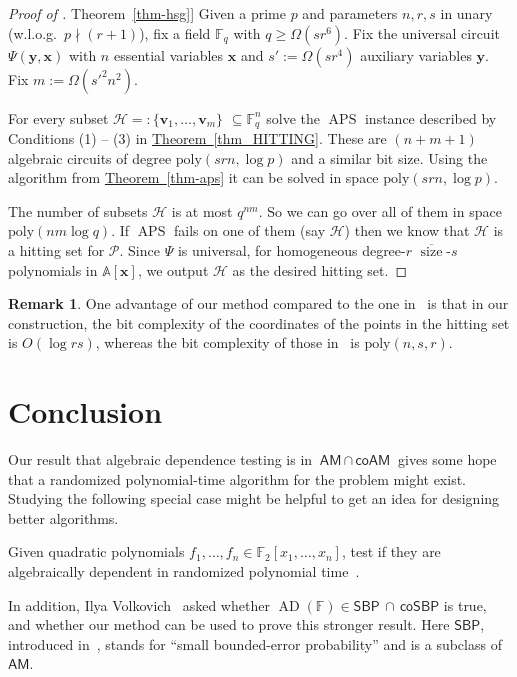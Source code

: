 \documentclass[11pt]{article}
\numberwithin{equation}{section}
\theoremstyle{definition}
\newtheorem{remark}[theorem]{Remark}
\theoremstyle{plain}
\newcommand{\cclass}[1]{\textsf{#1}}
\newcommand{\expref}[2]{\hyperref[#2]{#1~\ref{#2}}}
\newcommand{\F}{\mathbb{F}}
\newcommand{\calH}{\mathcal{H}}
\newcommand{\calP}{\mathcal{P}}
\newcommand{\aff}{\mathbb{A}}
\DeclareMathOperator{\sz}{\mathrm{size}}
\newcommand{\ol}[1]{\overline{#1}}
\newcommand{\AM}{\cclass{AM}\xspace}  %
\newcommand{\coAM}{\cclass{coAM}\xspace}  %
\newcommand{\AMcapcoAM}{\AM\,\cap\,\coAM}  %
\newcommand{\SBP}{\cclass{SBP}\xspace}  %
\newcommand{\coSBP}{\cclass{coSBP}\xspace}  %
\newcommand{\SBPcapcoSBP}{\SBP\,\cap\,\coSBP}  %
\DeclareMathOperator{\AD}{\mathrm{AD}\xspace} %
\DeclareMathOperator{\APS}{\mathrm{APS}\xspace} %
\begin{document}
\begin{proof}[Proof of \expref{Theorem}{thm-hsg}]
Given a prime $p$ and parameters $n, r, s$ in unary (w.l.o.g.\ $p\nmid(r+1)$), fix a field $\F_q$ with $q\ge\Omega(sr^6)$. Fix the universal circuit $\Psi(\mathbf{y},\mathbf{x})$ with $n$ essential variables $\mathbf{x}$ and $s':=\Omega(sr^4)$ auxiliary variables $\mathbf y$. Fix $m:=\Omega(s'^2n^2)$.

For every subset $\calH=:\{\mathbf v_1,\ldots, \mathbf v_m\}$ $\subseteq \F_q^n$ solve the $\APS$ instance described by 
Conditions 
%
(1) -- (3) %
in \expref{Theorem}{thm_HITTING}. These are $(n+m+1)$ algebraic circuits of degree 
%
$\mathrm{poly}(srn, \log p)$ and a similar bit size. %
Using the algorithm from \expref{Theorem}{thm-aps} it can be solved in 
%
space $\mathrm{poly}(srn, \log p)$. %

The number of subsets $\calH$ is 
at most %
$q^{nm}$. 
%
So we can go over all of them in space $\mathrm{poly}(nm\log q)$. %
If $\APS$ fails on one of them (say $\calH$) then we know that $\calH$ is a hitting set for $\calP$. Since $\Psi$ is universal, for homogeneous degree-$r$ $\ol{\sz}$-$s$ polynomials in $\aff[\mathbf x]$, we output $\calH$ as the desired hitting set.
\end{proof}

%
\begin{remark}   %
One advantage of our method compared to the one in~\cite{forbes2017pspace} is that
%
in our construction, the 
%
bit complexity of the coordinates of the points in the hitting set %
is $O(\log rs)$, whereas the
%
bit complexity of those in~\cite{forbes2017pspace} is  $\mathrm{poly}(n,s,r)$. %
\end{remark}

%
\section{Conclusion}\label{sec-conclusion}
%

Our result
%
that  %
algebraic dependence testing
is  %
in
%
$\AMcapcoAM$   %
gives
%
%
some hope   %
that a randomized
%
polynomial-time   %
algorithm for the problem
%
might exist.  %
Studying the following special case might be helpful to get an idea for designing better algorithms.

  Given quadratic polynomials $f_1,\ldots,f_n \in \F_2[x_1,\ldots,x_n]$, test if they are algebraically dependent in randomized polynomial time~\cite{pandey2016algebraic}.
  
 
In addition, Ilya Volkovich~\cite{Vol18} asked
%
%
%
%
whether $\AD(\F) \in \SBPcapcoSBP$ is true, and whether our method can be used to prove this stronger result. %
%
%
%
%
Here
%
%
%
%
$\SBP$, introduced in~\cite{BCM06},  %
stands for ``small bounded-error probability'' and is a subclass of $\AM$. %
\end{document}
